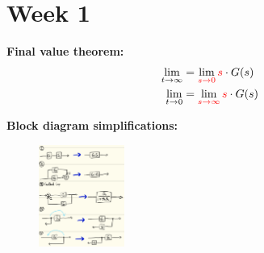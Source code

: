 \section{Week 1}
\textbf{Final value theorem:}
\begin{align*}
    \lim_{t\to \infty} &= \lim_{\color{red} s\to 0} \color{red} s \color{black} \cdot G(s) \\
    \lim_{t\to 0} &= \lim_{\color{red} s\to \infty} \color{red} s \color{black} \cdot G(s) \\
\end{align*}

\textbf{Block diagram simplifications:}
\begin{figure}[H]
    \centering
    \includegraphics[width=0.25\textwidth]{images/block_diagram_simplification.png}
\end{figure}